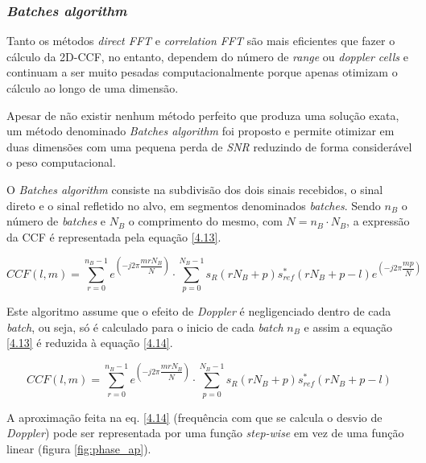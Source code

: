\subsubsection*{\textit{Batches algorithm}}
Tanto os métodos \textit{direct FFT} e \textit{correlation FFT} são mais eficientes que fazer o cálculo da \gls{2D-CCF}, no entanto, dependem do número de \textit{range} ou \textit{doppler cells} e continuam a ser muito pesadas computacionalmente porque apenas otimizam o cálculo ao longo de uma dimensão.\par 
Apesar de não existir nenhum método perfeito que produza uma solução exata, um método denominado \textit{Batches algorithm} foi proposto e permite otimizar em duas dimensões com uma pequena perda de \textit{\gls{SNR}} reduzindo de forma considerável o peso computacional.\par
O \textit{Batches algorithm} consiste na subdivisão dos dois sinais recebidos, o sinal direto e o sinal refletido no alvo, em segmentos denominados \textit{batches}. Sendo $n_{B}$ o número de \textit{batches} e $N_{B}$ o comprimento do mesmo, com $N=n_{B}\cdot N_{B}$, a expressão da \gls{CCF} é representada pela equação \ref{4.13}.

\begin{equation} \label{4.13}
CCF\left( l,m\right)=\sum_{r=0}^{n_{B}-1}e^{\left( -j2\pi \dfrac{mrN_{B}}{N}\right)}\cdot \sum_{p=0}^{N_{B}-1}s_{R}\left( rN_{B}+p\right)s_{ref}^{\ast}\left( rN_{B}+p-l\right) e^{\left( -j2\pi \dfrac{mp}{N}\right)}   
\end{equation}

Este algoritmo assume que o efeito de \textit{Doppler} é negligenciado dentro de cada \textit{batch}, ou seja, só é calculado para o inicio de cada \textit{batch} $n_{B}$ e assim a equação \ref{4.13} é reduzida à equação \ref{4.14}.

\begin{equation} \label{4.14}
CCF\left( l,m\right)=\sum_{r=0}^{n_{B}-1}e^{\left( -j2\pi \dfrac{mrN_{B}}{N}\right)}\cdot \sum_{p=0}^{N_{B}-1}s_{R}\left( rN_{B}+p\right)s_{ref}^{\ast}\left( rN_{B}+p-l\right)
\end{equation}

A aproximação feita na eq. \ref{4.14} (frequência com que se calcula o desvio de \textit{Doppler}) pode ser representada por uma função \textit{step-wise} em vez de uma função linear (figura \ref{fig:phase_ap}).

